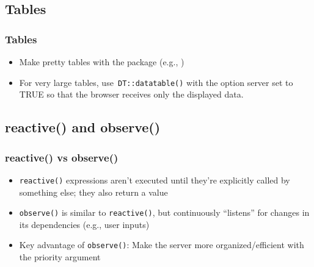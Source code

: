 \documentclass[
	11pt, %
]{beamer}
\begin{document}
\subsection{Tables}
\begin{frame}
	\frametitle{Tables}
	
	\begin{itemize}
	\item Make pretty tables with the \href{https://glin.github.io/reactable/}{} package (e.g., \href{https://glin.github.io/reactable/articles/womens-world-cup/womens-world-cup.html}{\color{blue}{2019 Women's World Cup Predictions}})
	\item For very large tables, use\texttt{ DT::datatable()} with the option server set to TRUE so that the browser receives only the displayed data.
	\end{itemize}
	
\end{frame}

\subsection{reactive() and observe()}

\begin{frame}
	\frametitle{reactive() vs observe()}
	
	\begin{itemize}
	\item \texttt{reactive()} expressions aren't executed until they're explicitly called by something else; they also return a value
	\item \texttt{observe()} is similar to \texttt{reactive()}, but continuously ``listens'' for changes in its dependencies (e.g., user inputs)
	\item Key advantage of \texttt{observe()}: Make the server more organized/efficient with the priority argument
	\end{itemize}
	
\end{frame}


\end{document}
